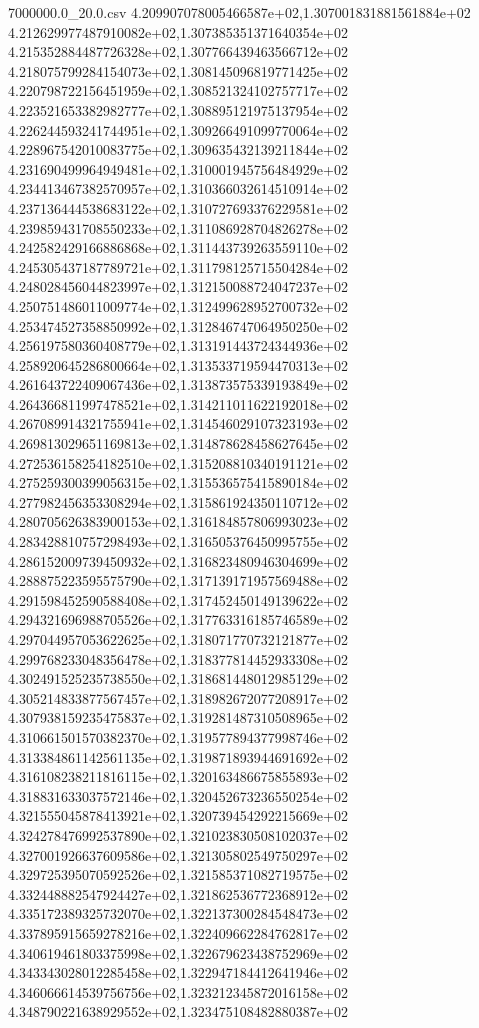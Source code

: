 \begin{filecontents*}{7000000.0_20.0.csv}
4.209907078005466587e+02,1.307001831881561884e+02
4.212629977487910082e+02,1.307385351371640354e+02
4.215352884487726328e+02,1.307766439463566712e+02
4.218075799284154073e+02,1.308145096819771425e+02
4.220798722156451959e+02,1.308521324102757717e+02
4.223521653382982777e+02,1.308895121975137954e+02
4.226244593241744951e+02,1.309266491099770064e+02
4.228967542010083775e+02,1.309635432139211844e+02
4.231690499964949481e+02,1.310001945756484929e+02
4.234413467382570957e+02,1.310366032614510914e+02
4.237136444538683122e+02,1.310727693376229581e+02
4.239859431708550233e+02,1.311086928704826278e+02
4.242582429166886868e+02,1.311443739263559110e+02
4.245305437187789721e+02,1.311798125715504284e+02
4.248028456044823997e+02,1.312150088724047237e+02
4.250751486011009774e+02,1.312499628952700732e+02
4.253474527358850992e+02,1.312846747064950250e+02
4.256197580360408779e+02,1.313191443724344936e+02
4.258920645286800664e+02,1.313533719594470313e+02
4.261643722409067436e+02,1.313873575339193849e+02
4.264366811997478521e+02,1.314211011622192018e+02
4.267089914321755941e+02,1.314546029107323193e+02
4.269813029651169813e+02,1.314878628458627645e+02
4.272536158254182510e+02,1.315208810340191121e+02
4.275259300399056315e+02,1.315536575415890184e+02
4.277982456353308294e+02,1.315861924350110712e+02
4.280705626383900153e+02,1.316184857806993023e+02
4.283428810757298493e+02,1.316505376450995755e+02
4.286152009739450932e+02,1.316823480946304699e+02
4.288875223595575790e+02,1.317139171957569488e+02
4.291598452590588408e+02,1.317452450149139622e+02
4.294321696988705526e+02,1.317763316185746589e+02
4.297044957053622625e+02,1.318071770732121877e+02
4.299768233048356478e+02,1.318377814452933308e+02
4.302491525235738550e+02,1.318681448012985129e+02
4.305214833877567457e+02,1.318982672077208917e+02
4.307938159235475837e+02,1.319281487310508965e+02
4.310661501570382370e+02,1.319577894377998746e+02
4.313384861142561135e+02,1.319871893944691692e+02
4.316108238211816115e+02,1.320163486675855893e+02
4.318831633037572146e+02,1.320452673236550254e+02
4.321555045878413921e+02,1.320739454292215669e+02
4.324278476992537890e+02,1.321023830508102037e+02
4.327001926637609586e+02,1.321305802549750297e+02
4.329725395070592526e+02,1.321585371082719575e+02
4.332448882547924427e+02,1.321862536772368912e+02
4.335172389325732070e+02,1.322137300284548473e+02
4.337895915659278216e+02,1.322409662284762817e+02
4.340619461803375998e+02,1.322679623438752969e+02
4.343343028012285458e+02,1.322947184412641946e+02
4.346066614539756756e+02,1.323212345872016158e+02
4.348790221638929552e+02,1.323475108482880387e+02

\end{filecontents*}
